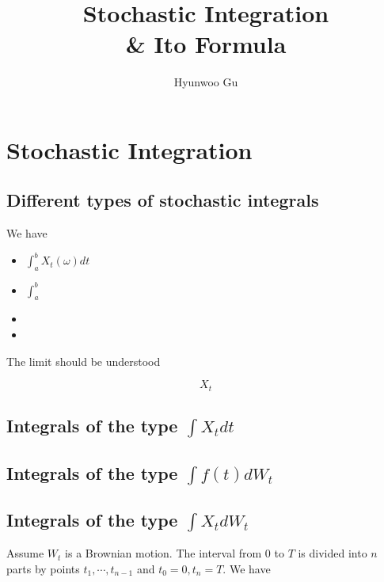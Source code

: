 \documentclass[12pt]{article}
\theoremstyle{nonumberbreak}
\begin{document}
\title{\textbf{Stochastic Integration \\ \& Ito Formula}}
\author{Hyunwoo Gu}
\date{}

\maketitle


\section{Stochastic Integration}

\subsection{Different types of stochastic integrals}

We have 


\begin{itemize}
	\item $\int_a^b X_t(\omega) dt$
	\item $\int_a^b $
	\item 
	\item
\end{itemize}


The limit should be understood 

$$
X_t 
$$



\subsection{Integrals of the type $\int X_t dt$}


\subsection{Integrals of the type $\int f(t) d W_t$}




\subsection{Integrals of the type $\int X_t d W_t$}


Assume $W_t$ is a Brownian motion. The interval from $0$ to $T$ is divided into $n$ parts by points $t_1,\cdots,t_{n-1}$ and $t_0=0,t_n=T$. We have
\end{document}

